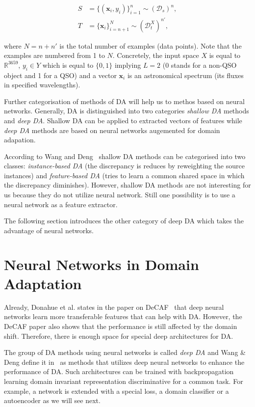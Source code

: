 \begin{align}
	S &= \{(\mathbf{x}_i, y_i)\}^n_{i = 1} \sim (\mathcal{D}_s)^n, \\
	T &= \{\mathbf{x}_i\}^N_{i = n + 1} \sim (\mathcal{D}^X_t)^{n'},
\end{align}

where \(N = n + n'\) is the total number of examples (data points).
Note that the examples are numbered from 1 to \(N\).
Concretely, the input space \(X\) is equal to \(\mathbb{R}^{3659}\),
\(y_i \in Y\) which is equal to \(\{0, 1\}\) implying \(L = 2\)
(0 stands for a non-QSO object and 1 for a QSO)
and a vector \(\mathbf{x}_i\) is an astronomical spectrum
(its fluxes in specified wavelengths).

Further categorisation of methods of DA
will help us to methos based on neural networks.
Generally, DA is distinguished into two categories
\textit{shallow DA} methods and \textit{deep DA}.
Shallow DA can be applied to extracted vectors of features
while \textit{deep DA} methods are based on neural networks
augemented for domain adapation.~\cite{csurka2017}

According to Wang and Deng~\cite{wang2018} shallow DA methods
can be categorised into two classes:
\textit{instance-based DA}
(the discrepancy is reduces by reweighting the source instances)
and \textit{feature-based DA}
(tries to learn a common shared space in which the discrepancy diminishes).
However, shallow DA methods are not interesting for us
because they do not utilize neural network.
Still one possibility is to use a neural network as a feature extractor.~\cite{csurka2017}

The following section introduces the other category of deep DA
which takes the advantage of neural networks.

\section{Neural Networks in Domain Adaptation}

Already, Donahue et al. states in the paper on DeCAF~\cite{donahue2014}
that deep neural networks learn more transferable features
that can help with DA.
However, the DeCAF paper also shows
that the performance is still affected by the domain shift.
Therefore, there is enough space for special deep architectures for DA.

The group of DA methods using neural networks is called \textit{deep DA}
and Wang \& Deng define it in~\cite{wang2018}
as methods that utilizes deep neural networks to enhance the performance of DA.
Such architectures can be trained with backpropagation
learning domain invariant representation discriminative for a common task.
For example, a network is extended with a special loss, a domain classifier
or a autoencoder as we will see next.

